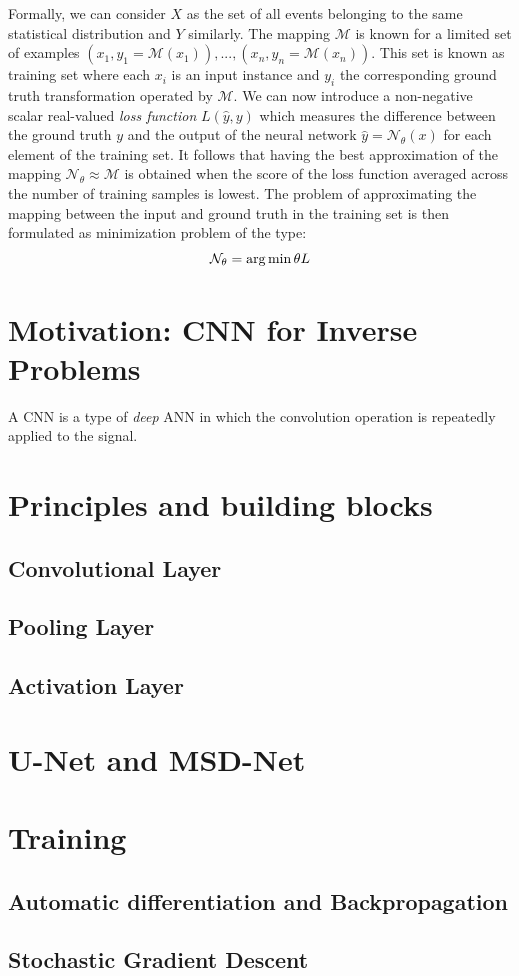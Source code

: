 Formally, we can consider $X$ as the set of all events belonging to the same statistical distribution and 
$Y$ similarly. The mapping $\mathcal{M}$ is known for a limited set of examples $(x_1,y_1 = \mathcal{M}(x_1)), ..., 
(x_n, y_n = \mathcal{M}(x_n))$. This set is known as training set where each $x_i$ is an input instance and $y_i$ the 
corresponding ground truth transformation operated by $\mathcal{M}$. We can now introduce a non-negative scalar 
real-valued \textit{loss function} $L(\hat{y},y )$ which measures the difference between the ground truth $y$ and the 
output of the neural network $\hat{y} = \mathcal{N}_\theta (x)$ for each element of the training set. 
It follows that having the best approximation of the mapping $ \mathcal{N}_\theta \approx \mathcal{M}$ is obtained when 
the score of the loss function averaged across the number of training samples is lowest. 
The problem of approximating the mapping between the input and ground truth in the training set is then formulated as 
minimization problem of the type: 
\begin{equation}
    \mathcal{N}_\theta = \operatorname*{arg\,min}{\theta} L
\end{equation}
 

% 

\section{Motivation: CNN for Inverse Problems}
A CNN is a type of \textit{deep} ANN in which the convolution operation is repeatedly applied to the signal. 




\section{Principles and building blocks}\label{chp:cnn}
\subsection{Convolutional Layer}
\subsection{Pooling Layer}
\subsection{Activation Layer}

\section{U-Net and MSD-Net}

\section{Training}
\subsection{Automatic differentiation and Backpropagation}
\subsection{Stochastic Gradient Descent}
